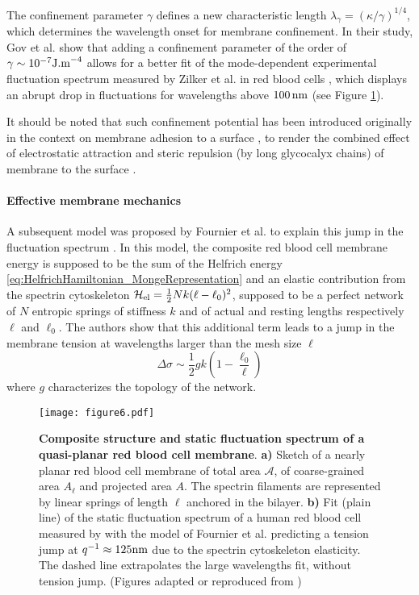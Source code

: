 \documentclass[graybox]{svmult}
\begin{document}
The confinement parameter $\gamma$ defines a new characteristic length $\lambda_{\gamma} = \left(\kappa/\gamma\right)^{1/4}$, which determines the wavelength onset for membrane confinement. In their study, Gov et al. show that adding a confinement parameter of the order of $\gamma \sim 10^{-7} \rm{J.m}^{-4}$ allows for a better fit of the mode-dependent experimental fluctuation spectrum measured by Zilker et al. in red blood cells \cite{Zilker:1987}, which displays an abrupt drop in fluctuations for wavelengths above $100\,\rm{nm}$ (see Figure \ref{fig:fig6}).

It should be noted that such confinement potential has been introduced originally in the context on membrane adhesion to a surface \cite{Radler:1995}, to render the combined effect of electrostatic attraction and steric repulsion (by long glycocalyx chains) of membrane to the surface \cite{Sackmann:2014}.

		\paragraph{\textbf{Effective membrane mechanics}}

A subsequent model was proposed by Fournier et al. to explain this jump in the fluctuation spectrum \cite{Fournier:2004}. In this model, the composite red blood cell membrane energy is supposed to be the sum of the Helfrich energy \eqref{eq:HelfrichHamiltonian_MongeRepresentation} and an elastic contribution from the spectrin cytoskeleton $\mathcal{H}_{\rm{el}} = \frac{1}{2}N k (\ell - \ell_0)^2$, supposed to be a perfect network of $N$ entropic springs of stiffness $k$ and of actual and resting lengths respectively $\ell$ and $\ell_0$. The authors show that this additional term leads to a jump in the membrane tension at wavelengths larger than the mesh size $\ell$
\begin{equation}
\Delta \sigma \sim \frac{1}{2}gk\left(1-\frac{\ell_0}{\ell}\right)
\end{equation}
where $g$ characterizes the topology of the network.

\begin{figure}
	\centering
		\texttt{[image: figure6.pdf]}
	\caption{\textbf{Composite structure and static fluctuation spectrum of a quasi-planar red blood cell membrane}. \textbf{a)} Sketch of a nearly planar red blood cell membrane of total area $\mathcal{A}$, of coarse-grained area $A_{\ell}$ and projected area $A$. The spectrin filaments are represented by linear springs of length $\ell$ anchored in the bilayer. \textbf{b)} Fit (plain line) of the static fluctuation spectrum of a human red blood cell measured by \cite{Zilker:1987} with the model of Fournier et al. \cite{Fournier:2004} predicting a tension jump at $q^{-1}\approx 125 \rm{nm}$ due to the spectrin cytoskeleton elasticity. The dashed line extrapolates the large wavelengths fit, without tension jump. (Figures adapted or reproduced from \cite{Fournier:2004})}
	\label{fig:fig6}
\end{figure}
\end{document}
